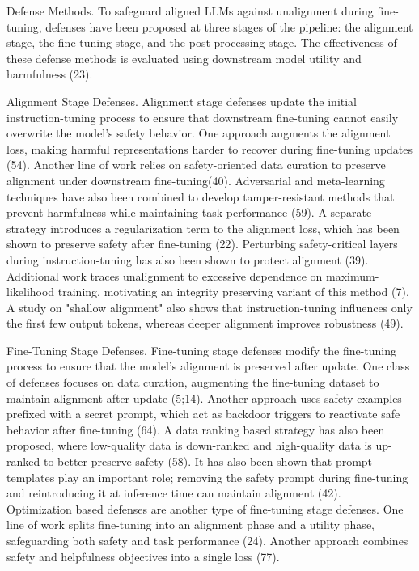\documentclass[10pt]{article}
\begin{document}
Defense Methods. To safeguard aligned LLMs against unalignment during fine-tuning, defenses have been proposed at three stages of the pipeline: the alignment stage, the fine-tuning stage, and the post-processing stage. The effectiveness of these defense methods is evaluated using downstream model utility and harmfulness (23).

Alignment Stage Defenses. Alignment stage defenses update the initial instruction-tuning process to ensure that downstream fine-tuning cannot easily overwrite the model's safety behavior. One approach augments the alignment loss, making harmful representations harder to recover during fine-tuning updates (54). Another line of work relies on safety-oriented data curation to preserve alignment under downstream fine-tuning(40). Adversarial and meta-learning techniques have also been combined to develop tamper-resistant methods that prevent harmfulness while maintaining task performance (59). A separate strategy introduces a regularization term to the alignment loss, which has been shown to preserve safety after fine-tuning (22). Perturbing safety-critical layers during instruction-tuning has also been shown to protect alignment (39). Additional work traces unalignment to excessive dependence on maximum-likelihood training, motivating an integrity preserving variant of this method (7). A study on "shallow alignment" also shows that instruction-tuning influences only the first few output tokens, whereas deeper alignment improves robustness (49).

Fine-Tuning Stage Defenses. Fine-tuning stage defenses modify the fine-tuning process to ensure that the model's alignment is preserved after update. One class of defenses focuses on data curation, augmenting the fine-tuning dataset to maintain alignment after update (5;14). Another approach uses safety examples prefixed with a secret prompt, which act as backdoor triggers to reactivate safe behavior after fine-tuning (64). A data ranking based strategy has also been proposed, where low-quality data is down-ranked and high-quality data is up-ranked to better preserve safety (58). It has also been shown that prompt templates play an important role; removing the safety prompt during fine-tuning and reintroducing it at inference time can maintain alignment (42).\\
Optimization based defenses are another type of fine-tuning stage defenses. One line of work splits fine-tuning into an alignment phase and a utility phase, safeguarding both safety and task performance (24). Another approach combines safety and helpfulness objectives into a single loss (77).
\end{document}
